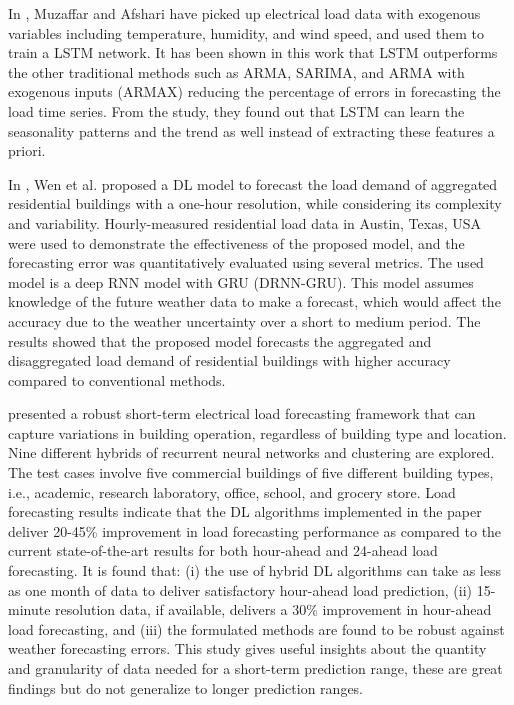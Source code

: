 In \cite{MUZAFFAR20192922}, Muzaffar and Afshari have picked up electrical load data with exogenous variables including temperature, humidity, and wind speed, and used them to train a LSTM network.
It has been shown in this work that LSTM outperforms the other traditional methods such as ARMA, SARIMA, and ARMA with exogenous inputs (ARMAX) reducing the percentage of errors in forecasting the load time series.
From the study, they found out that LSTM can learn the seasonality patterns and the trend as well instead of extracting these features a priori.

In \cite{WEN2020106073}, Wen et al. proposed a DL model to forecast the load demand of aggregated residential buildings with a one-hour resolution, while considering its complexity and variability.
Hourly-measured residential load data in Austin, Texas, USA were used to demonstrate the effectiveness of the proposed model, and the forecasting error was quantitatively evaluated using several metrics.
The used model is a deep RNN model with GRU (DRNN-GRU).
This model assumes knowledge of the future weather data to make a forecast, which would affect the accuracy due to the weather uncertainty over a short to medium period.
The results showed that the proposed model forecasts the aggregated and disaggregated load demand of residential buildings with higher accuracy compared to conventional methods.

\cite{CHITALIA2020115410} presented a robust short-term electrical load forecasting framework that can capture variations in building operation, regardless of building type and location.
Nine different hybrids of recurrent neural networks and clustering are explored.
The test cases involve five commercial buildings of five different building types, i.e., academic, research laboratory, office, school, and grocery store.
Load forecasting results indicate that the DL algorithms implemented in the paper deliver 20-45\% improvement in load forecasting performance as compared to the current state-of-the-art results for both hour-ahead and 24-ahead load forecasting.
It is found that:
(i) the use of hybrid DL algorithms can take as less as one month of data to deliver satisfactory hour-ahead load prediction,
(ii) 15-minute resolution data, if available, delivers a 30\% improvement in hour-ahead load forecasting,
and (iii) the formulated methods are found to be robust against weather forecasting errors.
This study gives useful insights about the quantity and granularity of data needed for a short-term prediction range, these are great findings but do not generalize to longer prediction ranges.

